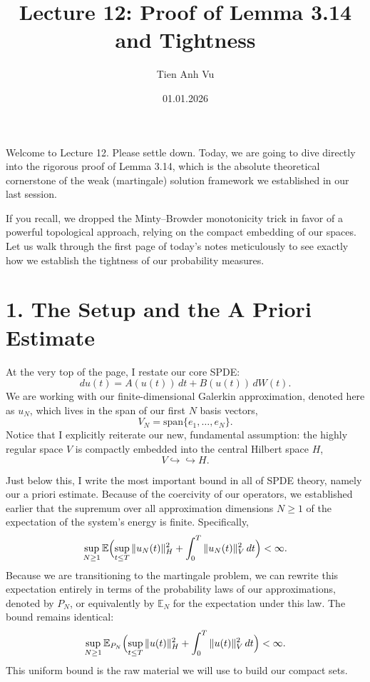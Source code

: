 \documentclass[11pt]{article}
\title{Lecture 12: Proof of Lemma 3.14 and Tightness}
\date{01.01.2026}
\author{Tien Anh Vu}
\theoremstyle{definition}
\theoremstyle{remark}
\begin{document}
\maketitle

Welcome to Lecture 12. Please settle down. Today, we are going to dive directly into the rigorous proof of Lemma 3.14, which is the absolute theoretical cornerstone of the weak (martingale) solution framework we established in our last session.

If you recall, we dropped the Minty--Browder monotonicity trick in favor of a powerful topological approach, relying on the compact embedding of our spaces. Let us walk through the first page of today's notes meticulously to see exactly how we establish the tightness of our probability measures.

\section*{1. The Setup and the A Priori Estimate}
At the very top of the page, I restate our core SPDE:
\[
  du(t)=A(u(t))\,dt+B(u(t))\,dW(t).
\]
We are working with our finite-dimensional Galerkin approximation, denoted here as $u_N$, which lives in the span of our first $N$ basis vectors,
\[
  V_N=\mathrm{span}\{e_1,\dots,e_N\}.
\]
Notice that I explicitly reiterate our new, fundamental assumption: the highly regular space $V$ is compactly embedded into the central Hilbert space $H$,
\[
  V\hookrightarrow\hookrightarrow H.
\]

Just below this, I write the most important bound in all of SPDE theory, namely our a priori estimate. Because of the coercivity of our operators, we established earlier that the supremum over all approximation dimensions $N\ge 1$ of the expectation of the system's energy is finite. Specifically,
\[
  \sup_{N\ge 1}\mathbb E\Bigl(
  \sup_{t\le T}\|u_N(t)\|_H^2+\int_0^T \|u_N(t)\|_V^2\,dt
  \Bigr)<\infty.
\]
Because we are transitioning to the martingale problem, we can rewrite this expectation entirely in terms of the probability laws of our approximations, denoted by $P_N$, or equivalently by $\mathbb E_N$ for the expectation under this law. The bound remains identical:
\[
  \sup_{N\ge 1}\mathbb E_{P_N}\Bigl(
  \sup_{t\le T}\|u(t)\|_H^2+\int_0^T \|u(t)\|_V^2\,dt
  \Bigr)<\infty.
\]
This uniform bound is the raw material we will use to build our compact sets.
\end{document}
